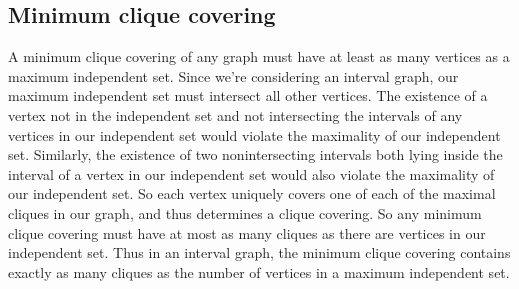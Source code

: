\documentclass[11pt]{article}
\begin{document}
\subsection{Minimum clique covering}
A minimum clique covering of any graph must have at least as many vertices as
a maximum independent set. Since we're considering an interval graph, our
maximum independent set must intersect all other vertices. The existence of a
vertex not in the independent set and not intersecting the intervals of any
vertices in our independent set would violate the maximality of our
independent set. Similarly, the existence of two nonintersecting intervals
both lying inside the interval of a vertex in our independent set would also
violate the maximality of our independent set. So each vertex uniquely covers
one of each of the maximal cliques in our graph, and thus determines a clique
covering. So any minimum clique covering must have at most as many cliques as
there are vertices in our independent set. Thus in an interval graph, the
minimum clique covering contains exactly as many cliques as the number of
vertices in a maximum independent set.




\end{document}
